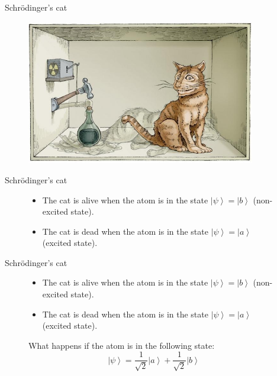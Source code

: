 \documentclass[10pt,pdf,hyperref={unicode}]{beamer}
\begin{document}
\begin{frame}{Schrödinger's cat}
 \begin{figure} 
   \includegraphics[width=100mm,scale=0.5]{catshred.jpg}
  \end{figure}
\end{frame}

\begin{frame}{Schrödinger's cat}
 \begin{figure} 
   \begin{itemize}
   \item The cat is alive when the atom is in the state $\left|\psi\right> = \left|b\right>$ (non-excited state).
   \item The cat is dead when the atom is in the state $\left|\psi\right> = \left|a\right>$ (excited state).
   \end{itemize}
 \end{figure}
\end{frame}


\begin{frame}{Schrödinger's cat}
 \begin{figure} 
   \begin{itemize}
   \item The cat is alive when the atom is in the state $\left|\psi\right> = \left|b\right>$ (non-excited state).
   \item The cat is dead when the atom is in the state $\left|\psi\right> = \left|a\right>$ (excited state).
   \end{itemize}
   What happens if the atom is in the following state:
   \[
   \left|\psi\right> = 
  \frac{1}{\sqrt{2}}\left|a\right> + \frac{1}{\sqrt{2}}\left|b\right>
   \]   
 \end{figure}
\end{frame}
\end{document}
